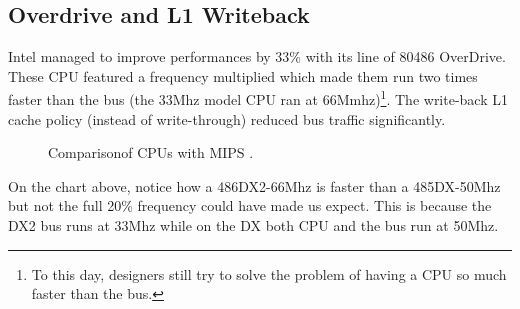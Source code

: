 \subsection{Overdrive and L1 Writeback}
Intel managed to improve performances by 33\% with its line of 80486 OverDrive. These CPU featured a frequency multiplied which made them run two times faster than the bus (the 33Mhz model CPU ran at 66Mmhz)\footnote{To this day, designers still try to solve the problem of having a CPU so much faster than the bus.}.  The write-back L1 cache policy (instead of write-through) reduced bus traffic significantly.\\
\par 
\vspace{10pt}
\par

\begin{figure}[H]
\centering
   \caption{Comparison\protect\footnotemark of CPUs with MIPS \protect\footnotemark.}
 \end{figure}
\par
On the chart above, notice how a 486DX2-66Mhz is faster than a 485DX-50Mhz but not the full 20\% frequency could have made us expect. This is because the DX2 bus runs at 33Mhz while on the DX both CPU and the bus run at 50Mhz.




